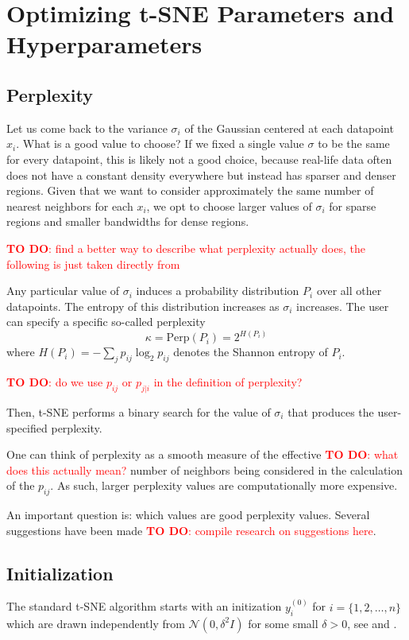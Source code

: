 \section{Optimizing t-SNE Parameters and Hyperparameters}

\subsection{Perplexity}
Let us come back to the variance $\sigma_i$ of the Gaussian centered at each datapoint $x_i$. What is a good value to choose? 
If we fixed a single value $\sigma$ to be the same for every datapoint, this is likely not a good choice, because real-life data often does not have a constant density everywhere but instead has sparser and denser regions. 
Given that we want to consider approximately the same number of nearest neighbors for each $x_i$, we opt to choose larger values of $\sigma_i$ for sparse regions and smaller bandwidths for dense regions. 

\textcolor{red}{\textbf{TO DO}: find a better way to describe what perplexity actually does, the following is just taken directly from \cite{vdMaa08}}

Any particular value of $\sigma_i$ induces a probability distribution $P_i$ over all other datapoints. 
The entropy of this distribution increases as $\sigma_i$ increases. 
The user can specify a specific so-called perplexity
\begin{equation}
    \kappa = \text{Perp}(P_i) = 2^{H(P_i)} 
\end{equation}
where $H(P_i) = -\sum_{j} p_{ij} \log_2 p_{ij}$ denotes the Shannon entropy of $P_i$. 

\textcolor{red}{\textbf{TO DO}: do we use $p_{ij}$ or $p_{j|i}$ in the definition of perplexity?}

Then, t-SNE performs a binary search for the value of $\sigma_i$ that produces the user-specified perplexity. 

One can think of perplexity as a smooth measure of the effective \textcolor{red}{\textbf{TO DO}: what does this actually mean?} number of neighbors being considered in the calculation of the $p_{ij}$. As such, larger perplexity values are computationally more expensive. 

An important question is: which values are good perplexity values. Several suggestions have been made \textcolor{red}{\textbf{TO DO}: compile research on suggestions here}. 


\subsection{Initialization}
The standard t-SNE algorithm starts with an initization $y_i^{(0)}$ for $i=\{1, 2, \dots, n\}$ which are drawn independently from $\mathcal{N}(0, \delta^2 I)$ for some small $\delta > 0$, see \cite{vdMaa08} and \cite{vdMaa14}. 

